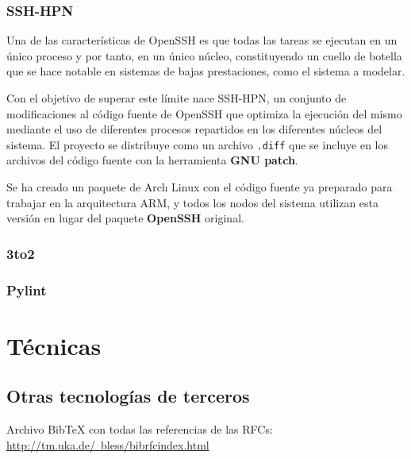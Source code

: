 \subsection{SSH-HPN}

Una de las características de OpenSSH es que todas las tareas se ejecutan en un único proceso y por tanto, en un único núcleo, constituyendo un cuello de botella que se hace notable en sistemas de bajas prestaciones, como el sistema a modelar.

Con el objetivo de superar este límite nace SSH-HPN\citationneeded, un conjunto de modificaciones al código fuente de OpenSSH que optimiza la ejecución del mismo mediante el uso de diferentes procesos repartidos en los diferentes núcleos del sistema. El proyecto se distribuye como un archivo \texttt{.diff} que se incluye en los archivos del código fuente con la herramienta \textbf{GNU patch}.

Se ha creado un paquete de Arch Linux con el código fuente ya preparado para trabajar en la arquitectura ARM, y todos los nodos del sistema utilizan esta versión en lugar del paquete \textbf{OpenSSH} original.

\subsection{3to2}

\subsection{Pylint}

\chapter{Técnicas}

\section{Otras tecnologías de terceros}

Archivo BibTeX con todas las referencias de las RFCs: \href{http://tm.uka.de/~bless/bibrfcindex.html}{http://tm.uka.de/~bless/bibrfcindex.html}
